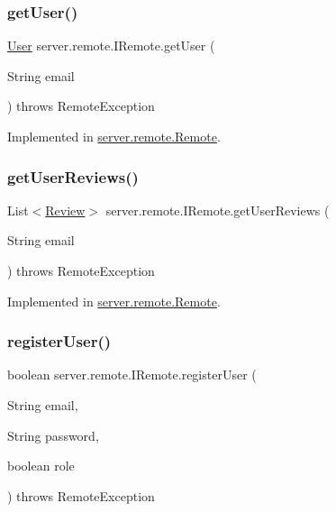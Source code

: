 \subsubsection{\texorpdfstring{get\+User()}{getUser()}}
{\footnotesize\ttfamily \hyperlink{classserver_1_1data_1_1_user}{User} server.\+remote.\+I\+Remote.\+get\+User (\begin{DoxyParamCaption}\item[{String}]{email }\end{DoxyParamCaption}) throws Remote\+Exception}



Implemented in \hyperlink{classserver_1_1remote_1_1_remote_abef8350014445d8f2d5ffb4c088e82b6}{server.\+remote.\+Remote}.

\mbox{\label{interfaceserver_1_1remote_1_1_i_remote_a9e52d282ba2386018ebd6817459a743f}} 
\subsubsection{\texorpdfstring{get\+User\+Reviews()}{getUserReviews()}}
{\footnotesize\ttfamily List$<$\hyperlink{classserver_1_1data_1_1_review}{Review}$>$ server.\+remote.\+I\+Remote.\+get\+User\+Reviews (\begin{DoxyParamCaption}\item[{String}]{email }\end{DoxyParamCaption}) throws Remote\+Exception}



Implemented in \hyperlink{classserver_1_1remote_1_1_remote_a396c96a6b8802c2b4658ecccd37e84db}{server.\+remote.\+Remote}.

\mbox{\label{interfaceserver_1_1remote_1_1_i_remote_a2e426f5eb58352993207ce0a24539f81}} 
\subsubsection{\texorpdfstring{register\+User()}{registerUser()}}
{\footnotesize\ttfamily boolean server.\+remote.\+I\+Remote.\+register\+User (\begin{DoxyParamCaption}\item[{String}]{email,  }\item[{String}]{password,  }\item[{boolean}]{role }\end{DoxyParamCaption}) throws Remote\+Exception}



